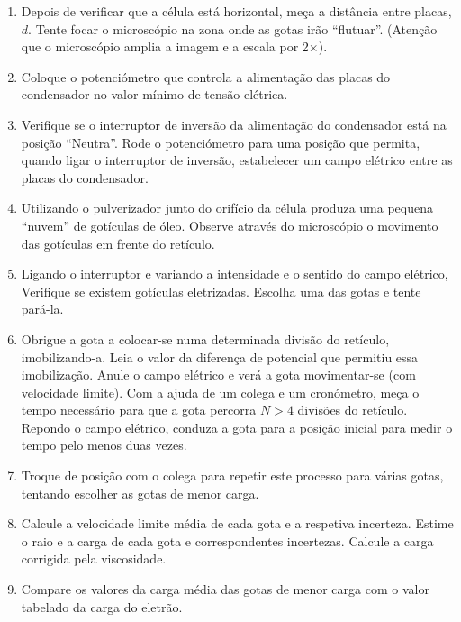 \documentclass[a4paper,twoside,12pt]{article}      %
\begin{document}
\begin{enumerate}
\item   Depois de verificar que a célula está horizontal, meça a distância entre placas, $d$. Tente focar o microscópio na zona onde as gotas irão ``flutuar''. (Atenção que o microscópio amplia a imagem e a escala por 2$\times$).
\item Coloque o potenciómetro que 
controla a alimentação das placas do condensador no valor mínimo de tensão elétrica. 
\item    Verifique se o interruptor de inversão da alimentação do condensador está na posição ``Neutra''.
Rode o potenciómetro para uma posição que permita, quando ligar o interruptor de inversão, estabelecer um campo elétrico entre as placas do condensador. 
\item     Utilizando o pulverizador junto do orifício da célula produza uma pequena ``nuvem'' %
de gotículas de óleo. Observe através do microscópio o movimento das gotículas em 
frente do retículo.
\item     Ligando o interruptor e variando a intensidade  e o  sentido do campo elétrico, Verifique se existem gotículas eletrizadas. Escolha uma das gotas e tente pará-la.
 \item Obrigue a gota a colocar-se numa determinada divisão do retículo, imobilizando-a. 
Leia o valor da diferença de potencial que permitiu essa imobilização. Anule o 
campo elétrico  e verá a gota movimentar-se (com velocidade limite). Com a ajuda de um colega e um 
cronómetro, meça o tempo necessário para que a gota percorra  $N>4$ divisões
do retículo. Repondo o campo elétrico, conduza a gota para a posição inicial para  medir o tempo pelo menos duas vezes. 
\item Troque de posição com o colega para repetir este processo para várias gotas, tentando escolher as gotas de menor carga.
\item   Calcule a velocidade limite média de cada gota e a respetiva incerteza. Estime o raio e 
a carga de cada gota e correspondentes incertezas. Calcule a carga corrigida pela viscosidade.
\item   Compare os valores da carga média das gotas de menor carga  com o valor tabelado da carga do eletrão. 
\end{enumerate}



\end{document}
